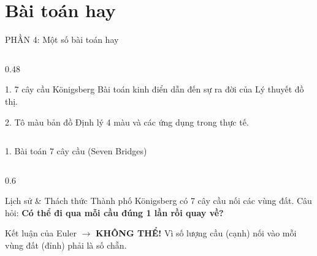\documentclass[11pt]{beamer}
\author[Tung Tung Tung Sahur]{Tung Tung Tung Sahur}
\newenvironment{mainbox}[1]{\begin{block}{#1}}{\end{block}}
\newenvironment{highlightbox}[1]{\begin{alertblock}{#1}}{\end{alertblock}}
\begin{document}
\section{Bài toán hay}

\begin{frame}{ PHẦN 4: Một số bài toán hay }
    \begin{center}
    \end{center}
    \vspace{0.3cm}
    \begin{columns}[T]
        \begin{column}{0.48\textwidth}
            \begin{mainbox}{1. 7 cây cầu Königsberg}
                Bài toán kinh điển dẫn đến sự ra đời của Lý thuyết đồ thị.
            \end{mainbox}
            \vspace{0.2cm}
            \begin{mainbox}{2. Tô màu bản đồ}
                Định lý 4 màu và các ứng dụng trong thực tế.
            \end{mainbox}
        \end{column}
     
    \end{columns}
\end{frame}

\begin{frame}{1. Bài toán 7 cây cầu (Seven Bridges)}
    \begin{columns}[T]
        \begin{column}{0.6\textwidth}
            \begin{mainbox}{Lịch sử \& Thách thức}
                Thành phố Königsberg có 7 cây cầu nối các vùng đất. Câu hỏi: \textbf{Có thể đi qua mỗi cầu đúng 1 lần rồi quay về?}
            \end{mainbox}
            \vspace{0.3cm}
            \begin{highlightbox}{Kết luận của Euler}
                $\rightarrow$ \textbf{KHÔNG THỂ!} 
                Vì số lượng cầu (cạnh) nối vào mỗi vùng đất (đỉnh) phải là số chẵn.
            \end{highlightbox}
        \end{column}
    
    \end{columns}
\end{frame}
\end{document}
